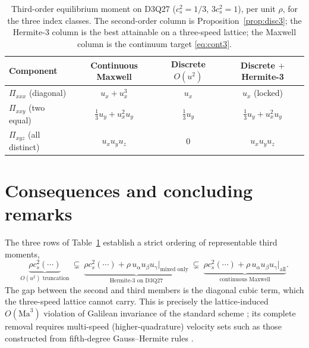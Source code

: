 \documentclass[preprint,11pt]{elsarticle}
\newcommand{\cs}{c_s}
\begin{document}
\begin{table}[t]
\centering
\caption{Third-order equilibrium moment on D3Q27 ($\cs^{2}=1/3$, $3\cs^{2}=1$),
per unit $\rho$, for the three index classes. The second-order column is
Proposition~\ref{prop:disc3}; the Hermite-3 column is the best attainable on a
three-speed lattice; the Maxwell column is the continuum target
\eqref{eq:cont3}.}
\label{tab:summary}
\begin{tabular}{lccc}
\toprule
Component & Continuous Maxwell & Discrete $O(u^{2})$ & Discrete $+$ Hermite-3 \\
\midrule
$\Pi_{xxx}$ (diagonal) & $u_x+u_x^{3}$ & $u_x$ & $u_x$ \;(locked) \\
$\Pi_{xxy}$ (two equal) & $\tfrac13 u_y+u_x^{2}u_y$ & $\tfrac13 u_y$ &
$\tfrac13 u_y+u_x^{2}u_y$ \\
$\Pi_{xyz}$ (all distinct) & $u_x u_y u_z$ & $0$ & $u_x u_y u_z$ \\
\bottomrule
\end{tabular}
\end{table}

\section{Consequences and concluding remarks}
\label{sec:concl}

The three rows of Table~\ref{tab:summary} establish a strict ordering of
representable third moments,
\begin{equation}
\underbrace{\rho\cs^{2}(\cdots)}_{O(u^{2})\text{ truncation}}
\ \subsetneq\
\underbrace{\rho\cs^{2}(\cdots)+\rho\,u_\alpha u_\beta u_\gamma\big|_{\text{mixed only}}}_{\text{Hermite-3 on D3Q27}}
\ \subsetneq\
\underbrace{\rho\cs^{2}(\cdots)+\rho\,u_\alpha u_\beta u_\gamma\big|_{\text{all}}}_{\text{continuous Maxwell}} .
\label{eq:hierarchy}
\end{equation}
The gap between the second and third members is the diagonal cubic term, which
the three-speed lattice cannot carry. This is precisely the lattice-induced
$O(\mathrm{Ma}^{3})$ violation of Galilean invariance of the standard scheme
\citep{QianOrszag1993,ChikatamarlaKarlin2006}; its complete removal requires
multi-speed (higher-quadrature) velocity sets such as those constructed from
fifth-degree Gauss--Hermite rules \citep{ChikatamarlaKarlin2009}.
\end{document}
